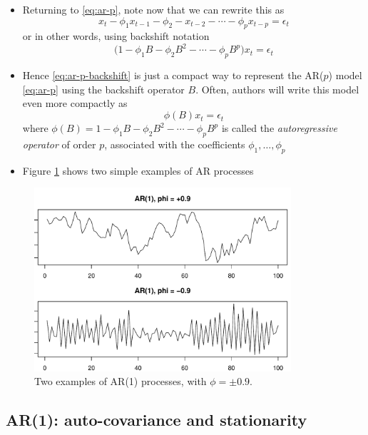 \documentclass{article}
\begin{document}
\begin{itemize}
\item Returning to \eqref{eq:ar-p}, note now that we can rewrite this as 
  \[
  x_t - \phi_1 x_{t-1} - \phi_2 - x_{t-2} - \cdots - \phi_p x_{t-p} = \epsilon_t  
  \]
  or in other words, using backshift notation 
  \begin{equation}
  \label{eq:ar-p-backshift}
  \Big(1 - \phi_1 B - \phi_2 B^2 - \cdots - \phi_p B^p \Big) x_t = \epsilon_t 
  \end{equation}

\item Hence \eqref{eq:ar-p-backshift} is just a compact way to represent the
  AR($p$) model \eqref{eq:ar-p} using the backshift operator $B$. Often, authors
  will write this model even more compactly as  
  \begin{equation}
  \label{eq:ar-p-phi}
  \phi(B) x_t = \epsilon_t 
  \end{equation}
  where $\phi(B) = 1 - \phi_1 B - \phi_2 B^2 - \cdots - \phi_p B^p$ is called
  the \emph{autoregressive operator} of order $p$, associated with the
  coefficients $\phi_1,\dots,\phi_p$

\item Figure \ref{fig:ar} shows two simple examples of AR processes
\end{itemize}

\begin{figure}[htb]
\centering
\includegraphics[width=0.85\textwidth]{fig/ar-1.pdf}
\caption{Two examples of AR(1) processes, with $\phi = \pm 0.9$.}
\label{fig:ar}
\end{figure}

\subsection{AR(1): auto-covariance and stationarity}
\end{document}
